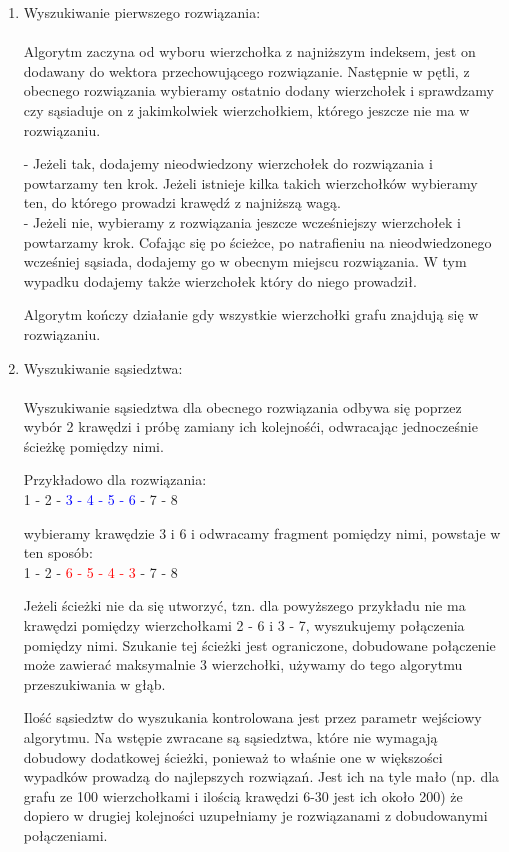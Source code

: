 \documentclass{article}
\begin{document}
\renewcommand{\labelenumi}{2.\arabic{enumi}}
\begin{enumerate}
\item \large Wyszukiwanie pierwszego rozwiązania:\\ \normalsize\\
  Algorytm zaczyna od wyboru wierzchołka z najniższym indeksem, jest on dodawany
  do wektora przechowującego rozwiązanie. Następnie w pętli, z obecnego
  rozwiązania wybieramy ostatnio dodany wierzchołek i sprawdzamy czy sąsiaduje
  on z jakimkolwiek wierzchołkiem, którego jeszcze nie ma w rozwiązaniu. 
  
  - Jeżeli tak, dodajemy nieodwiedzony wierzchołek do rozwiązania i powtarzamy
  ten krok. Jeżeli istnieje kilka takich wierzchołków wybieramy ten, do którego
  prowadzi krawędź z najniższą wagą.
  \\- Jeżeli nie, wybieramy z rozwiązania jeszcze wcześniejszy
  wierzchołek i powtarzamy krok. Cofając się po ścieżce, po natrafieniu na
  nieodwiedzonego wcześniej sąsiada, dodajemy go w obecnym miejscu rozwiązania.
  W tym wypadku dodajemy także wierzchołek który do niego prowadził.
  
  Algorytm kończy działanie gdy wszystkie wierzchołki grafu znajdują się w rozwiązaniu.

\item \large Wyszukiwanie sąsiedztwa:\\ \normalsize\\
  Wyszukiwanie sąsiedztwa dla obecnego rozwiązania odbywa się poprzez wybór 2
  krawędzi i próbę zamiany ich kolejnośći, odwracając jednocześnie ścieżkę pomiędzy nimi.
  
  Przykładowo dla rozwiązania:
  \\1 - 2 - \textcolor{blue}{3 - 4 - 5 - 6} - 7 - 8
  
  wybieramy krawędzie 3 i 6 i odwracamy fragment pomiędzy nimi, powstaje w ten sposób:
  \\1 - 2 - \textcolor{red}{6 - 5 - 4 - 3} - 7 - 8

  Jeżeli ścieżki nie da się utworzyć, tzn. dla powyższego przykładu nie ma krawędzi
  pomiędzy wierzchołkami 2 - 6 i 3 - 7, wyszukujemy połączenia pomiędzy nimi.
  Szukanie tej ścieżki jest ograniczone, dobudowane połączenie może zawierać
  maksymalnie 3 wierzchołki, używamy do tego algorytmu przeszukiwania w głąb.

  Ilość sąsiedztw do wyszukania kontrolowana jest przez parametr wejściowy
  algorytmu. Na wstępie zwracane są sąsiedztwa, które nie wymagają dobudowy
  dodatkowej ścieżki, ponieważ to właśnie one w większości wypadków prowadzą
  do najlepszych rozwiązań. Jest ich na tyle mało (np. dla grafu ze 100
  wierzchołkami i ilością krawędzi 6-30 jest ich około 200) że dopiero w drugiej
  kolejności uzupełniamy je rozwiązanami z dobudowanymi połączeniami.


\end{enumerate}
\end{document}

